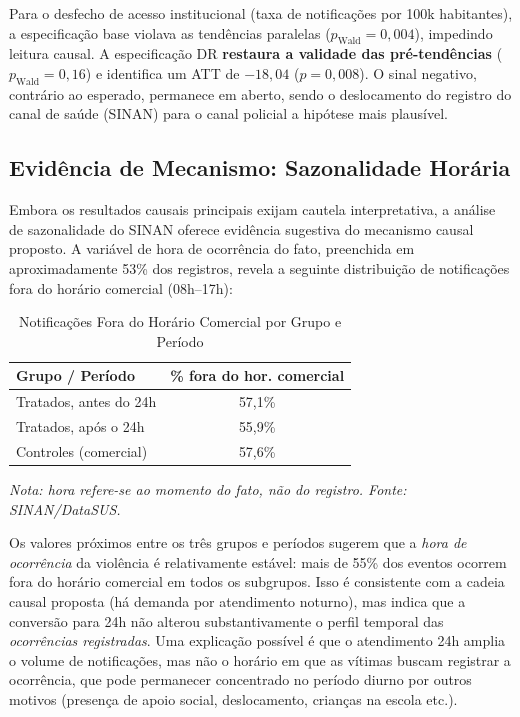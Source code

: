 \documentclass[twocolumn, 10pt]{article}
\begin{document}
Para o desfecho de acesso institucional (taxa de notificações por 100k
habitantes), a especificação base violava as tendências paralelas
($p_{\text{Wald}}=0{,}004$), impedindo leitura causal. A especificação DR
\textbf{restaura a validade das pré-tendências} ($p_{\text{Wald}}=0{,}16$) e
identifica um ATT de $-18{,}04$ ($p=0{,}008$). O sinal negativo, contrário ao
esperado, permanece em aberto, sendo o deslocamento do registro do canal de
saúde (SINAN) para o canal policial a hipótese mais plausível.

\subsection{Evidência de Mecanismo: Sazonalidade Horária}

Embora os resultados causais principais exijam cautela interpretativa, a análise
de sazonalidade do SINAN oferece evidência sugestiva do mecanismo causal proposto.
A variável de hora de ocorrência do fato, preenchida em aproximadamente 53\% dos
registros, revela a seguinte distribuição de notificações fora do horário
comercial (08h--17h):

\begin{table}[H]
\centering
\caption{Notificações Fora do Horário Comercial por Grupo e Período}
\label{tab:saz}
\small
\begin{tabular}{@{}lc@{}}
\toprule
\textbf{Grupo / Período} & \textbf{\% fora do hor. comercial} \\
\midrule
Tratados, antes do 24h  & 57,1\% \\
Tratados, após o 24h    & 55,9\% \\
Controles (comercial)    & 57,6\% \\
\bottomrule
\end{tabular}
\smallskip\par
{\footnotesize\sffamily\itshape
Nota: hora refere-se ao momento do fato, não do registro.
Fonte: SINAN/DataSUS.}
\end{table}

Os valores próximos entre os três grupos e períodos sugerem que a \textit{hora
de ocorrência} da violência é relativamente estável: mais de 55\% dos eventos
ocorrem fora do horário comercial em todos os subgrupos. Isso é consistente com
a cadeia causal proposta (há demanda por atendimento noturno), mas indica que a
conversão para 24h não alterou substantivamente o perfil temporal das
\textit{ocorrências registradas}. Uma explicação possível é que o atendimento
24h amplia o volume de notificações, mas não o horário em que as vítimas buscam
registrar a ocorrência, que pode permanecer concentrado no período diurno por
outros motivos (presença de apoio social, deslocamento, crianças na escola etc.).
\end{document}
